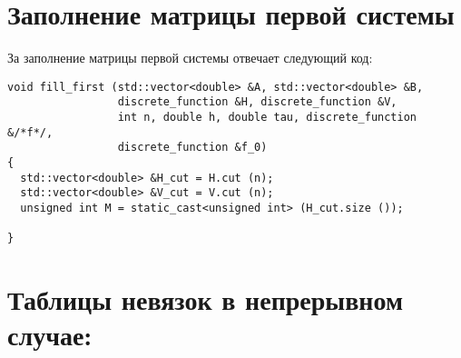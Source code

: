 \documentclass[a4paper,11pt]{article}
\begin{document}
\newpage
\section{Заполнение матрицы первой системы}
За заполнение матрицы первой системы отвечает следующий код:
\begin{verbatim}
void fill_first (std::vector<double> &A, std::vector<double> &B,
                 discrete_function &H, discrete_function &V,
                 int n, double h, double tau, discrete_function &/*f*/,
                 discrete_function &f_0)
{
  std::vector<double> &H_cut = H.cut (n);
  std::vector<double> &V_cut = V.cut (n);
  unsigned int M = static_cast<unsigned int> (H_cut.size ());

}
\end{verbatim}

\newpage
\section{Таблицы невязок в непрерывном случае:}
\end{document}
